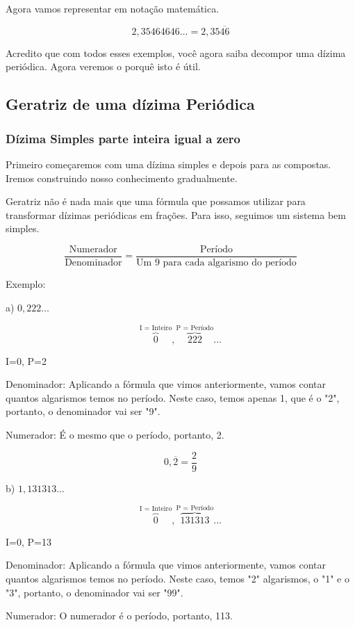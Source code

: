 \documentclass[letterpaper]{book}
\begin{document}
Agora vamos representar em notação matemática.

\[2,35464646\ldots = 2,35\overline{46}\]

Acredito que com todos esses exemplos, você agora saiba decompor uma dízima periódica. Agora veremos o porquê isto é útil.

\subsection{Geratriz de uma dízima Periódica}

\subsubsection{Dízima Simples parte inteira igual a zero}

Primeiro começaremos com uma dízima simples e depois para as compostas. Iremos construindo nosso conhecimento gradualmente.

Geratriz não é nada mais que uma fórmula que possamos utilizar para transformar dízimas periódicas em frações. Para isso, seguimos um sistema bem simples.

\[\dfrac{\text{Numerador}}{\text{Denominador}} = \dfrac{\text{Período}}{\text{Um 9 para cada algarismo do período}}\]

Exemplo:

a) \(0,222\ldots\)

\[\overbrace{0}^{\text{I = Inteiro}},\overbrace{222}^{\text{P = Período}}\ldots\]

I=0, P=2

Denominador: Aplicando a fórmula que vimos anteriormente, vamos contar quantos algarismos temos no período. Neste caso, temos apenas 1, que é o "2", portanto, o denominador vai ser "9".

Numerador: É o mesmo que o período, portanto, 2.

\[0,\overline{2} = \dfrac{2}{9}\]

b) \(1,131313...\)

\[\overbrace{0}^{\text{I = Inteiro}},\overbrace{131313}^{\text{P = Período}}\ldots\]

I=0, P=13

Denominador: Aplicando a fórmula que vimos anteriormente, vamos contar quantos algarismos temos no período. Neste caso, temos "2" algarismos, o "1" e o "3", portanto, o denominador vai ser "99".

Numerador: O numerador é o período, portanto, 113.
\end{document}

